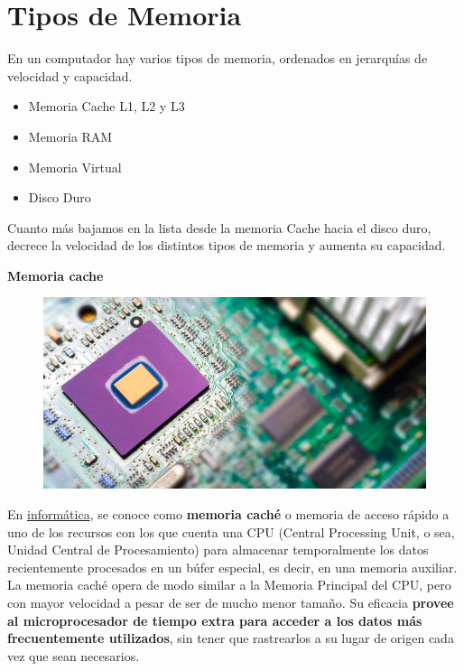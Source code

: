 \documentclass[10pt,letterpaper]{article}
\begin{document}
\newpage
\section{Tipos de Memoria} \label{contenido}


\begin{justify}
	En un computador hay varios tipos de memoria, ordenados en jerarquías de velocidad y capacidad.\\
	
	\begin{itemize}
		\item Memoria Cache L1, L2 y L3
		\item Memoria RAM 
		\item Memoria Virtual 
		\item Disco Duro 		
	\end{itemize}
	Cuanto más bajamos en la lista desde la memoria Cache hacia el disco duro, decrece la velocidad de los distintos tipos de memoria y aumenta su capacidad.\\
	
	\begin{center}
	\textbf{Memoria cache}
	\end{center}

	\begin{figure}[h]
		\centering
		\includegraphics[scale=0.3]{images/cache.jpg}
	\end{figure}
	
	\noindent
	En \underline{informática}, se conoce como \textbf{memoria caché} o memoria de acceso rápido a uno de los recursos con los que cuenta una CPU (Central Processing Unit, o sea, Unidad Central de Procesamiento) para almacenar temporalmente los datos recientemente procesados en un búfer especial, es decir, en una memoria auxiliar.\cite{segunda} \\ 
	
	\noindent
	La memoria caché opera de modo similar a la Memoria Principal del CPU, pero con mayor velocidad a pesar de ser de mucho menor tamaño. Su eficacia \textbf{provee al microprocesador de tiempo extra para acceder a los datos más frecuentemente utilizados}, sin tener que rastrearlos a su lugar de origen cada vez que sean necesarios.\\
	

\end{justify}
\end{document}
